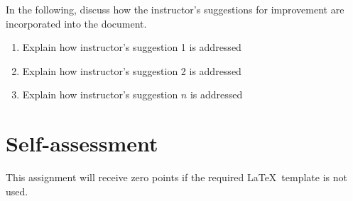 \documentclass[11pt]{article}
\begin{document}
In the following, discuss how the instructor's suggestions for improvement are incorporated into the document.

\begin{enumerate}

   \item Explain how instructor's suggestion 1 is addressed

   \item Explain how instructor's suggestion 2 is addressed

   \item Explain how instructor's suggestion $n$ is addressed

\end{enumerate}


\section{Self-assessment} \label{sec:assessment}

This assignment will receive zero points if the required \LaTeX{}\ template is not used. 
\end{document}
